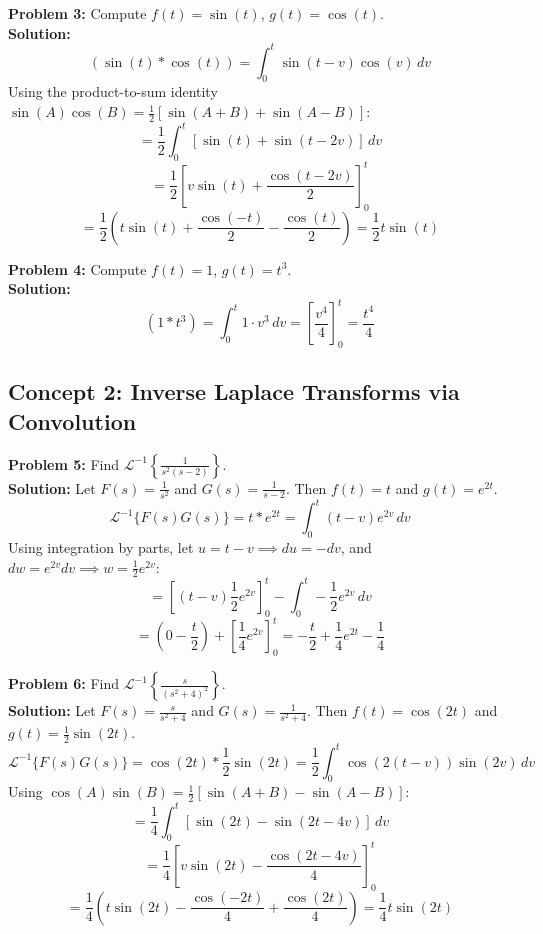 \documentclass[11pt, letterpaper]{article}
\theoremstyle{definition}
\theoremstyle{remark}
\begin{document}
\textbf{Problem 3:} Compute $f(t) = \sin(t)$, $g(t) = \cos(t)$.
\vspace{0.5em}\\
\textbf{Solution:}
\[ (\sin(t) * \cos(t)) = \int_0^t \sin(t-v)\cos(v) \, dv \]
Using the product-to-sum identity $\sin(A)\cos(B) = \frac{1}{2}[\sin(A+B) + \sin(A-B)]$:
\[ = \frac{1}{2} \int_0^t [\sin(t) + \sin(t-2v)] \, dv \]
\[ = \frac{1}{2} \left[ v\sin(t) + \frac{\cos(t-2v)}{2} \right]_0^t \]
\[ = \frac{1}{2} \left( t\sin(t) + \frac{\cos(-t)}{2} - \frac{\cos(t)}{2} \right) = \frac{1}{2}t\sin(t) \]

\textbf{Problem 4:} Compute $f(t) = 1$, $g(t) = t^3$.
\vspace{0.5em}\\
\textbf{Solution:}
\[ (1 * t^3) = \int_0^t 1 \cdot v^3 \, dv = \left[ \frac{v^4}{4} \right]_0^t = \frac{t^4}{4} \]

\subsection{Concept 2: Inverse Laplace Transforms via Convolution}

\textbf{Problem 5:} Find $\mathcal{L}^{-1}\left\{\frac{1}{s^2(s-2)}\right\}$.
\vspace{0.5em}\\
\textbf{Solution:}
Let $F(s) = \frac{1}{s^2}$ and $G(s) = \frac{1}{s-2}$. Then $f(t) = t$ and $g(t) = e^{2t}$.
\[ \mathcal{L}^{-1}\{F(s)G(s)\} = t * e^{2t} = \int_0^t (t-v)e^{2v} \, dv \]
Using integration by parts, let $u = t-v \implies du = -dv$, and $dw = e^{2v}dv \implies w = \frac{1}{2}e^{2v}$:
\[ = \left[ (t-v)\frac{1}{2}e^{2v} \right]_0^t - \int_0^t -\frac{1}{2}e^{2v} \, dv \]
\[ = \left( 0 - \frac{t}{2} \right) + \left[ \frac{1}{4}e^{2v} \right]_0^t = -\frac{t}{2} + \frac{1}{4}e^{2t} - \frac{1}{4} \]

\textbf{Problem 6:} Find $\mathcal{L}^{-1}\left\{\frac{s}{(s^2+4)^2}\right\}$.
\vspace{0.5em}\\
\textbf{Solution:}
Let $F(s) = \frac{s}{s^2+4}$ and $G(s) = \frac{1}{s^2+4}$. Then $f(t) = \cos(2t)$ and $g(t) = \frac{1}{2}\sin(2t)$.
\[ \mathcal{L}^{-1}\{F(s)G(s)\} = \cos(2t) * \frac{1}{2}\sin(2t) = \frac{1}{2} \int_0^t \cos(2(t-v))\sin(2v) \, dv \]
Using $\cos(A)\sin(B) = \frac{1}{2}[\sin(A+B) - \sin(A-B)]$:
\[ = \frac{1}{4} \int_0^t [\sin(2t) - \sin(2t-4v)] \, dv \]
\[ = \frac{1}{4} \left[ v\sin(2t) - \frac{\cos(2t-4v)}{4} \right]_0^t \]
\[ = \frac{1}{4} \left( t\sin(2t) - \frac{\cos(-2t)}{4} + \frac{\cos(2t)}{4} \right) = \frac{1}{4}t\sin(2t) \]
\end{document}
